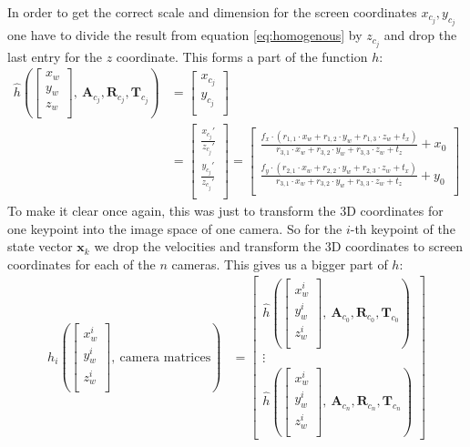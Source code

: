 In order to get the correct scale and dimension for the screen coordinates  $x_{c_j}, y_{c_j}$ one have to divide the result from equation \ref{eq:homogenous} by $z_{c_j}$ and drop the last entry for the $z$ coordinate. This forms a part of the function $h$:
\begin{align}\label{eq:screencoordinates}
\hat{h}(\begin{bmatrix}
x_w \\
y_w \\
z_w \\
\end{bmatrix},\  \mathbf{A}_{c_j}, \mathbf{R}_{c_j}, \mathbf{T}_{c_j}) &=
\begin{bmatrix}
	x_{c_j} \\
	y_{c_j} \\
\end{bmatrix} \\
&= 
\begin{bmatrix}
\frac{x_{c_j}'}{z_{c_j}'} \\
\frac{y_{c_j}'}{z_{c_j}'} \\
\end{bmatrix} = 
\begin{bmatrix}
\frac{f_x \cdot (r_{1,1} \cdot x_w + r_{1,2} \cdot y_w + r_{1,3} \cdot z_w + t_x)}{r_{3,1} \cdot x_w + r_{3,2} \cdot y_w + r_{3,3} \cdot z_w + t_z } + x_0 \\
\frac{f_y \cdot (r_{2,1} \cdot x_w + r_{2,2} \cdot y_w + r_{2,3} \cdot z_w + t_x)}{r_{3,1} \cdot x_w + r_{3,2} \cdot y_w + r_{3,3} \cdot z_w + t_z } + y_0 \\
\end{bmatrix}
\end{align}
To make it clear once again, this was just to transform the 3D coordinates for one keypoint into the image space of one camera. So for the $i$-th keypoint of the state vector $\mathbf{x}_k$ we drop the velocities and transform the 3D coordinates to screen coordinates for each of the $n$ cameras. This gives us a bigger part of $h$:
\begin{align}
h_i(\begin{bmatrix}
x^i_w \\
y^i_w \\
z^i_w \\
\end{bmatrix},\ \text{camera matrices}) 
& = 
\begin{bmatrix}
\hat{h}(
\begin{bmatrix}
x^i_w \\
y^i_w \\
z^i_w \\
\end{bmatrix},\  \mathbf{A}_{c_0}, \mathbf{R}_{c_0}, \mathbf{T}_{c_0})\\
\vdots \\
\hat{h}(
\begin{bmatrix}
x^i_w \\
y^i_w \\
z^i_w \\
\end{bmatrix},\  \mathbf{A}_{c_n}, \mathbf{R}_{c_n}, \mathbf{T}_{c_n})
\end{bmatrix}
\end{align}
